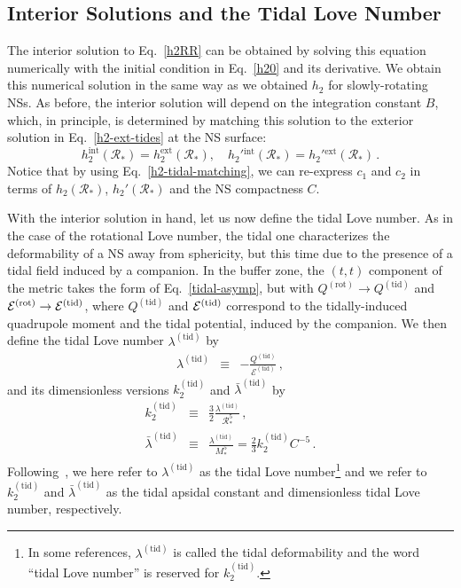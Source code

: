 \documentclass[aps,twocolumn,nofootinbib,showpacs,superscriptaddress,hyperref]{revtex4-1}
\newcommand\be{\begin{equation}}
\newcommand\ba{\begin{eqnarray}}
\newcommand\ee{\end{equation}}
\newcommand\ea{\end{eqnarray}}
\newcommand{\NS}{*}
\newcommand{\ext}{\mathrm{ext}}
\newcommand{\inter}{\mathrm{int}}
\newcommand{\RNS}{\mathcal{R}_*}
\newcommand{\tid}{\mathrm{(tid)}}
\newcommand{\rot}{\mathrm{(rot)}}
\newcommand{\lambdabartid}{\bar{\lambda}^\mathrm{(tid)}}
\begin{document}
\subsection{Interior Solutions and the Tidal Love Number}

The interior solution to Eq.~\eqref{h2RR} can be obtained by solving this equation numerically with the initial condition in Eq.~\eqref{h20} and its derivative. We obtain this numerical solution in the same way as we obtained $h_{2}$ for slowly-rotating NSs. As before, the interior solution will depend on the integration constant $B$, which, in principle, is determined by matching this solution to the exterior solution in Eq.~\eqref{h2-ext-tides} at the NS surface:
%
\be
h_2^\inter (\RNS) = h_2^\ext (\RNS), \quad h_2'{}^\inter (\RNS) = h_2'{}^\ext (\RNS)\,.
\label{h2-tidal-matching}
\ee
%
Notice that by using Eq.~\eqref{h2-tidal-matching}, we can re-express $c_1$ and $c_2$ in terms of $h_2(\RNS)$, $h_2'(\RNS)$ and the NS compactness $C$.

With the interior solution in hand, let us now define the tidal Love number. As in the case of the rotational Love number, the tidal one characterizes the deformability of a NS away from sphericity, but this time due to the presence of a tidal field induced by a companion. In the buffer zone, the $(t,t)$ component of the metric takes the form of Eq.~\eqref{tidal-asymp}, but with $Q^\rot \to Q^{\tid}$ and $\mathcal{E}^\rot \to {\cal{E}}^{\tid}$, where $Q^\tid$ and ${\cal{E}}^{\tid}$ correspond to the tidally-induced quadrupole moment and the tidal potential, induced by the companion. We then define the tidal Love number $\lambda^\tid$ by
%
\ba
\lambda^\tid & \equiv & - \frac{Q^\tid}{\mathcal{E}^\tid}\,,
\label{tid-Love-def-ori}
\ea
%  
and its dimensionless versions $k_2^\tid$ and $\lambdabartid$ by 
%
\ba
k_2^\tid &\equiv & \frac{3}{2} \frac{\lambda^\tid}{\RNS^5}\,, \\
\bar{\lambda}^\tid &\equiv & \frac{\lambda^\tid}{M_\NS^5} = \frac{2}{3} k_2^\tid C^{-5}\,.
\label{tid-Love-def}
\ea
%  
Following~\cite{flanagan-hinderer-love}, we here refer to $\lambda^\tid$ as the tidal Love number\footnote{In some references, $\lambda^\tid$ is called the tidal deformability and the word ``tidal Love number'' is reserved for $k_2^\tid$.} and we refer to $k_2^\tid$ and $\lambdabartid$ as the tidal apsidal constant and dimensionless tidal Love number, respectively.
\end{document}

